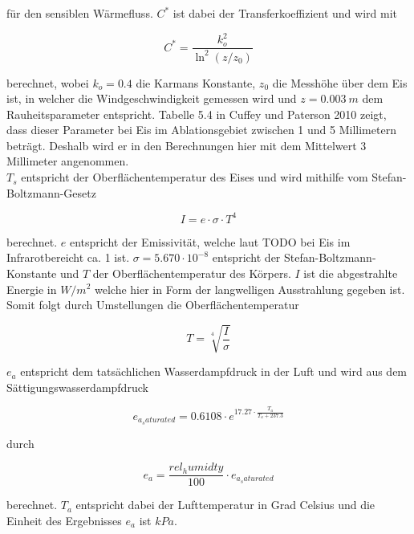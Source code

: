 \documentclass[12pt,a4paper]{article}
\begin{document}
für den sensiblen Wärmefluss. $C^*$ ist dabei der Transferkoeffizient und wird mit 

\begin{equation}
C^{*}=\frac{k_{o}^{2}}{\ln ^{2}\left(z / z_{0}\right)}
\end{equation}

berechnet, wobei $k_{o}=0.4$ die Karmans Konstante, $z_{0}$ die Messhöhe über dem Eis ist, in welcher die Windgeschwindigkeit gemessen wird und $z=0.003~m$ dem Rauheitsparameter entspricht. Tabelle 5.4 in Cuffey und Paterson 2010 zeigt, dass dieser Parameter bei Eis im Ablationsgebiet zwischen 1 und 5 Millimetern beträgt. Deshalb wird er in den Berechnungen hier mit dem Mittelwert 3 Millimeter angenommen.\\ %

$T_s$ entspricht der Oberflächentemperatur des Eises und wird mithilfe vom Stefan-Boltzmann-Gesetz 

\begin{equation}
I = e \cdot \sigma \cdot T^4
\end{equation}

berechnet. $e$ entspricht der Emissivität, welche laut TODO bei Eis im Infrarotbereicht ca. 1 ist. $\sigma=5.670 \cdot 10^{-8}$ entspricht der Stefan-Boltzmann-Konstante und $T$ der Oberflächentemperatur des Körpers. $I$ ist die abgestrahlte Energie in $W/m^2$ welche hier in Form der langwelligen Ausstrahlung gegeben ist. Somit folgt durch Umstellungen die Oberflächentemperatur

\begin{equation}\label{eq:Oberflächentemperatur}
T = \sqrt[4]{\frac{I}{\sigma}}
\end{equation}


$e_a$ entspricht dem tatsächlichen Wasserdampfdruck in der Luft und wird aus dem Sättigungswasserdampfdruck


\begin{equation}
e_{a_saturated}=0.6108 \cdot e^{17.27 \cdot \frac{T_a}{T_a + 237.3}}
\end{equation}

durch

\begin{equation}
e_a = \frac{rel_humidty}{100} \cdot e_{a_saturated}
\end{equation}

berechnet. $T_a$ entspricht dabei der Lufttemperatur in Grad Celsius und die Einheit des Ergebnisses $e_a$ ist $kPa$.\\
\end{document}
